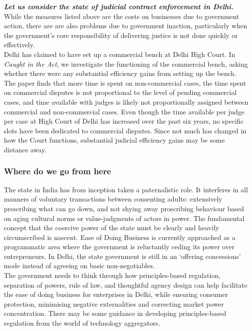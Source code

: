 \documentclass[a4paper, 12pt, twoside]{article}
\begin{document}
\textbf{\textit{Let us consider the state of judicial contract enforcement in Delhi.}}\\

While the measures listed above are the costs on businesses due to government action, there are are also problems due to government inaction, particularly when the government’s core responsibility of delivering justice is not done quickly or effectively. \\

Delhi has claimed to have set up a commercial bench at Delhi High Court. In \textit{Caught in the Act}, we investigate the functioning of the commercial bench, asking whether there were any substantial efficiency gains from setting up the bench. The paper finds that more time is spent on non-commercial cases, the time spent on commercial disputes is not proportional to the level of pending commercial cases, and time available with judges is likely not proportionally assigned between commercial and non-commercial cases. Even though the time available per judge per case at High Court of Delhi has increased over the past six years, no specific slots have been dedicated to commercial disputes. Since not much has changed in how the Court functions, substantial judicial efficiency gains may be some distance away.

\subsubsection*{Where do we go from here}

The state in India has from inception taken a paternalistic role. It interferes in all manners of voluntary transactions between consenting adults: extensively prescribing what can go down, and not shying away proscribing behaviour based on aging cultural norms or value-judgments of actors in power. The fundamental concept that the coercive power of the state must be clearly and heavily circumscribed is nascent. Ease of Doing Business is currently approached as a programmatic area where the government is reluctantly ceding its power over entrepreneurs. In Delhi, the state government is still in an ‘offering concessions’ mode instead of agreeing on basic non-negotiables. \\

The government needs to think through how principles-based regulation, separation of powers, rule of law, and thoughtful agency design can help facilitate the ease of doing business for enterprises in Delhi, while ensuring consumer protection, minimising negative externalities and correcting market power concentration. There may be some guidance in developing principles-based regulation from the world of technology aggregators. \\
\end{document}
